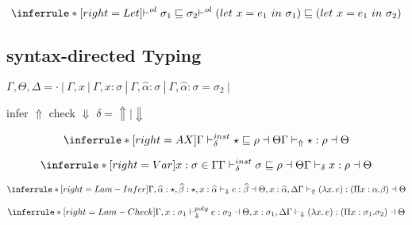 \[
\inferrule*[right=Let]
{
\olpolymorphic {\sigma_1} {\sigma_2 }}
{\olpolymorphic {(let\ x = e_1\ in\ \sigma_1)} {(let\ x = e_1\ in\ \sigma_2) }}
\]


\clearpage

\fi

\subsection{syntax-directed Typing}

\newcommand{\checktype}{\Gamma\vdash_\Downarrow}
\newcommand{\infertype}{\Gamma\vdash_\Uparrow}
\newcommand{\infercheck}{\Gamma\vdash_\delta}

\newcommand{\checktypeno}{\vdash_\Downarrow}
\newcommand{\infertypeno}{\vdash_\Uparrow}
\newcommand{\infercheckno}{\vdash_\delta}

\newcommand{\instinfer}{\vdash^{inst}_\Uparrow}
\newcommand{\instcheck}{\vdash^{inst}_\Downarrow}
\newcommand{\instinfercheck}{\vdash^{inst}_\delta}

\newcommand{\polyinfer}{\Gamma\vdash^{poly}_\Uparrow}
\newcommand{\polycheck}{\Gamma\vdash^{poly}_\Downarrow}
\newcommand{\polycheckno}{\vdash^{poly}_\Downarrow}
\newcommand{\polyinfercheck}{\vdash^{poly}_\delta}

\newcommand{\polymorphic}{\vdash^{dsk}}
\newcommand{\polymorphicstar}{\vdash^{dsk}}

\newcommand{\unify}{\vdash^{unify}}


$\Gamma, \Theta, \Delta  = \cdot~|~\Gamma, x~|~\Gamma, x:\sigma~|~\Gamma, \widehat{\alpha}:\sigma~|~\Gamma, \widehat{\alpha}:\sigma = \sigma_2~|$

\framebox{$ \infercheck e : \rho \dashv \Theta $ } infer $\Uparrow$ check $\Downarrow$ $\delta = \Uparrow \mid \Downarrow$

\[
\inferrule*[right=AX]
{\Gamma \instinfercheck \star \sqsubseteq \rho \dashv \Theta}
{\infertype \star : \rho \dashv \Theta}
\]

\[
\inferrule*[right=Var]
{x:\sigma \in \Gamma \\ \Gamma \instinfercheck \sigma \sqsubseteq \rho \dashv \Theta }
{\infercheck x : \rho \dashv \Theta}
\]

\[
\inferrule*[right=Lam-Infer]
{\Gamma, \widehat{\alpha}:\star, \widehat{\beta}:\star, x: \widehat \alpha \checktypeno e : \widehat \beta \dashv \Theta, x:\widehat \alpha , \Delta}
{\infertype (\lambda x.\, e) : (\Pi x: \alpha. \beta) \dashv \Theta}
\]

\[
\inferrule*[right=Lam-Check]
{\Gamma,x: \sigma_1 \polycheckno e : \sigma_2 \dashv \Theta, x: \sigma_1, \Delta}
{\checktype (\lambda x.\, e) : (\Pi x: \sigma_1. \sigma_2) \dashv \Theta}
\]

